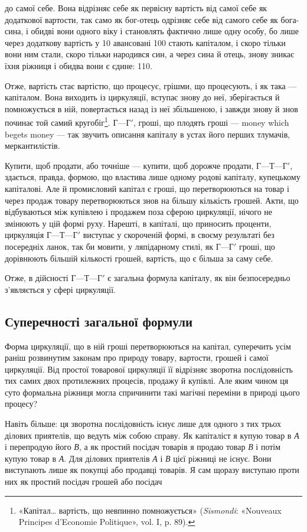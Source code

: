 \parcont{}  %
до самої себе. Вона відрізняє себе як первісну вартість від самої
себе як додаткової вартости, так само як бог-отець одрізняє
себе від самого себе як бога-сина, і обидві вони одного віку
і становлять фактично лише одну особу, бо лише через додаткову
вартість у 10 авансовані 100
стають капіталом, і скоро тільки вони ним стали, скоро тільки
народився син, а через сина й отець, знову зникає їхня ріжниця
і обидва вони є єдине: 110.

Отже, вартість стає вартістю, що процесує, грішми, що процесують,
і як така — капіталом. Вона виходить із циркуляції,
вступає знову до неї, зберігається й помножується в ній, повертається
назад із неї збільшеною, і завжди знову й знов починає той
самий кругобіг\footnote{
«Капітал\dots{} вартість, що невпинно помножується» (\emph{Sismondi}: «Nouveaux
Principes d’Economie Politique», vol. I, p. 89).
}. $Г — Г'$, гроші, що плодять гроші — money which
begets money — так звучить описання капіталу в устах його
перших тлумачів, меркантилістів.

Купити, щоб продати, або точніше — купити, щоб дорожче
продати, $Г — Т — Г'$, здається, правда, формою, що властива
лише одному родові капіталу, купецькому капіталові. Але й
промисловий капітал є гроші, що перетворюються на товар і
через продаж товару перетворюються знов на більшу кількість
грошей. Акти, що відбуваються між купівлею і продажем поза
сферою циркуляції, нічого не змінюють у цій формі руху. Нарешті,
в капіталі, що приносить проценти, циркуляція $Г — Т — Г'$
виступає у скороченій формі, в своєму результаті без посередніх
ланок, так би мовити, у ляпідарному стилі, як $Г — Г'$ гроші, що
дорівнюють більшій кількості грошей, вартість, що є більша за
саму себе.

Отже, в дійсності $Г — Т — Г'$ є загальна формула капіталу,
як він безпосередньо з’являється у сфері циркуляції.

\subsection{Суперечності загальної формули}

Форма циркуляції, що в ній гроші перетворюються на капітал,
суперечить усім раніш розвинутим законам про природу товару,
вартости, грошей і самої циркуляції. Від простої товарової
циркуляції її відрізняє зворотна послідовність тих самих двох
протилежних процесів, продажу й купівлі. Але яким чином
ця суто формальна ріжниця могла спричинити такі магічні переміни
в природі цього процесу?

Навіть більше: ця зворотна послідовність існує лише для
одного з тих трьох ділових приятелів, що ведуть між собою
справу. Як капіталіст я купую товар в \emph{А} і перепродую його \emph{В},
а як простий посідач товарів я продаю товар \emph{В} і потім купую
товар в \emph{А}. Для ділових приятелів \emph{А} і \emph{В} цієї ріжниці не існує.
Вони виступають лише як покупці або продавці товарів. Я сам
щоразу виступаю проти них як простий посідач грошей або посідач
\parbreak{}  %
